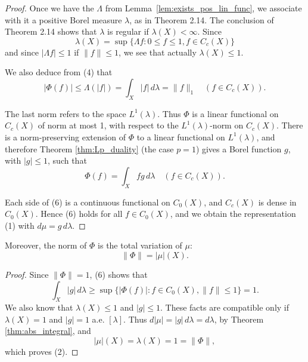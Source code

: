 \begin{proof}
  Once we have the $\Lambda$ from Lemma~\ref{lem:exists_pos_lin_func}, we associate with it a positive Borel measure $\lambda$, as in Theorem 2.14.
  The conclusion of Theorem 2.14 shows that $\lambda$ is regular if $\lambda(X) < \infty$.
  Since
  \begin{equation}
    \lambda(X) = \sup \{\Lambda f : 0 \leq f \leq 1, f \in C_c(X)\}
  \end{equation}
  and since $|\Lambda f| \leq 1$ if $\|f\| \leq 1$, we see that actually $\lambda(X) \leq 1$.

  We also deduce from (4) that
  \begin{equation}
    |\Phi(f)| \leq \Lambda(|f|) = \int_X |f| \, d\lambda = \|f\|_1 \quad (f \in C_c(X)). \tag{5}
  \end{equation}

  The last norm refers to the space $L^1(\lambda)$.
  Thus $\Phi$ is a linear functional on $C_c(X)$ of norm at most 1, with respect to the $L^1(\lambda)$-norm on $C_c(X)$.
  There is a norm-preserving extension of $\Phi$ to a linear functional on $L^1(\lambda)$, and therefore Theorem \ref{thm:Lp_duality} (the case $p = 1$) gives a Borel function $g$, with $|g| \leq 1$, such that
  \begin{equation}
    \Phi(f) = \int_X fg \, d\lambda \quad (f \in C_c(X)). \tag{6}
  \end{equation}

  Each side of (6) is a continuous functional on $C_0(X)$, and $C_c(X)$ is dense in $C_0(X)$.
  Hence (6) holds for all $f \in C_0(X)$, and we obtain the representation (1) with $d\mu = g \, d\lambda$.
\end{proof}

\begin{lemma}[Rudin 6.19]
  \label{lem:norm_eq_variation}
  Moreover, the norm of $\Phi$ is the total variation of $\mu$:
  \begin{equation}
    \|\Phi\| = |\mu|(X). \tag{2}
  \end{equation}
\end{lemma}

\begin{proof}
  Since $\|\Phi\| = 1$, (6) shows that
  \begin{equation}
    \int_X |g| \, d\lambda \geq \sup \{|\Phi(f)| : f \in C_0(X), \|f\| \leq 1\} = 1. \tag{7}
  \end{equation}
  We also know that $\lambda(X) \leq 1$ and $|g| \leq 1$.
  These facts are compatible only if $\lambda(X) = 1$ and $|g| = 1$ a.e. $[\lambda]$.
  Thus $d|\mu| = |g| \, d\lambda = d\lambda$, by Theorem \ref{thm:abs_integral}, and
  \begin{equation}
    |\mu|(X) = \lambda(X) = 1 = \|\Phi\|, \tag{8}
  \end{equation}
  which proves (2).
\end{proof}
